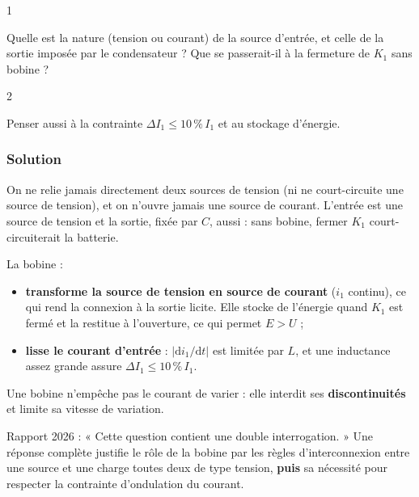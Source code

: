 \documentclass[11pt,a4paper]{article}
\providecommand{\tightlist}{\setlength{\itemsep}{0pt}\setlength{\parskip}{0pt}}
\begin{document}
\begin{indication}{1}

Quelle est la nature (tension ou courant) de la source d'entrée, et celle de la sortie imposée par le condensateur ? Que se passerait-il à la fermeture de \(K_1\) sans bobine ?

\end{indication}

\begin{indication}{2}

Penser aussi à la contrainte \(\Delta I_1\le10\,\%\,I_1\) et au stockage d'énergie.

\end{indication}

\hypertarget{solution-15}{%
\subsubsection{Solution}\label{solution-15}}

On ne relie jamais directement deux sources de tension (ni ne court-circuite une source de tension), et on n'ouvre jamais une source de courant. L'entrée est une source de tension et la sortie, fixée par \(C\), aussi : sans bobine, fermer \(K_1\) court-circuiterait la batterie.

La bobine :

\begin{itemize}
\tightlist
\item
  \textbf{transforme la source de tension en source de courant} (\(i_1\) continu), ce qui rend la connexion à la sortie licite. Elle stocke de l'énergie quand \(K_1\) est fermé et la restitue à l'ouverture, ce qui permet \(E>U\) ;
\item
  \textbf{lisse le courant d'entrée} : \(|\mathrm di_1/\mathrm dt|\) est limitée par \(L\), et une inductance assez grande assure \(\Delta I_1\le10\,\%\,I_1\).
\end{itemize}

\begin{piege}

Une bobine n'empêche pas le courant de varier : elle interdit ses \textbf{discontinuités} et limite sa vitesse de variation.

\end{piege}

\begin{jury}

Rapport 2026 : « Cette question contient une double interrogation. » Une réponse complète justifie le rôle de la bobine par les règles d'interconnexion entre une source et une charge toutes deux de type tension, \textbf{puis} sa nécessité pour respecter la contrainte d'ondulation du courant.

\end{jury}
\end{document}
